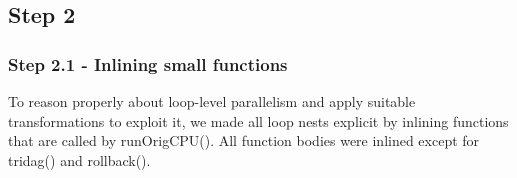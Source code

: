 \documentclass{article}
\begin{document}
\subsection*{Step 2}
\subsubsection*{Step 2.1 - Inlining small functions}
To reason properly about loop-level parallelism and apply suitable transformations to exploit it, we made all loop nests explicit by inlining functions that are called by runOrigCPU(). All function bodies were inlined except for tridag() and rollback().
\end{document}
